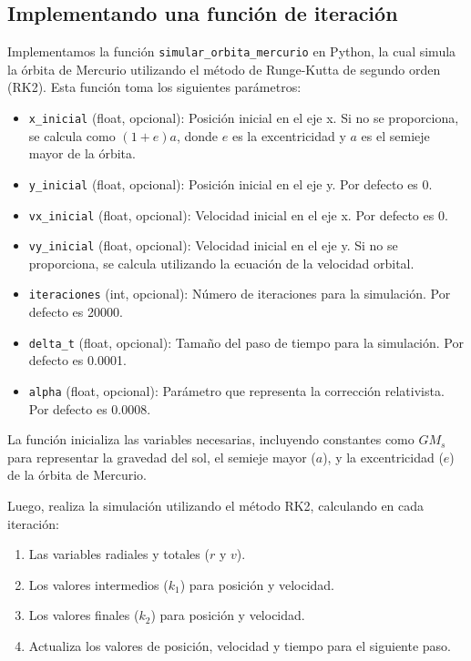 \documentclass[twocolumn]{article}
\begin{document}
\subsection*{Implementando una función de iteración}

Implementamos la función \texttt{simular\_orbita\_mercurio} en Python, la cual simula la órbita de Mercurio utilizando el método de Runge-Kutta de segundo orden (RK2). Esta función toma los siguientes parámetros:

\begin{itemize}
    \item \texttt{x\_inicial} (float, opcional): Posición inicial en el eje x. Si no se proporciona, se calcula como $(1+e)a$, donde $e$ es la excentricidad y $a$ es el semieje mayor de la órbita.
    \item \texttt{y\_inicial} (float, opcional): Posición inicial en el eje y. Por defecto es 0.
    \item \texttt{vx\_inicial} (float, opcional): Velocidad inicial en el eje x. Por defecto es 0.
    \item \texttt{vy\_inicial} (float, opcional): Velocidad inicial en el eje y. Si no se proporciona, se calcula utilizando la ecuación de la velocidad orbital.
    \item \texttt{iteraciones} (int, opcional): Número de iteraciones para la simulación. Por defecto es 20000.
    \item \texttt{delta\_t} (float, opcional): Tamaño del paso de tiempo para la simulación. Por defecto es 0.0001.
    \item \texttt{alpha} (float, opcional): Parámetro que representa la corrección relativista. Por defecto es 0.0008.
\end{itemize}

La función inicializa las variables necesarias, incluyendo constantes como $GM_s$ para representar la gravedad del sol, el semieje mayor ($a$), y la excentricidad ($e$) de la órbita de Mercurio.

Luego, realiza la simulación utilizando el método RK2, calculando en cada iteración:
\begin{enumerate}
    \item Las variables radiales y totales ($r$ y $v$).
    \item Los valores intermedios ($k_1$) para posición y velocidad.
    \item Los valores finales ($k_2$) para posición y velocidad.
    \item Actualiza los valores de posición, velocidad y tiempo para el siguiente paso.
\end{enumerate}
\end{document}
